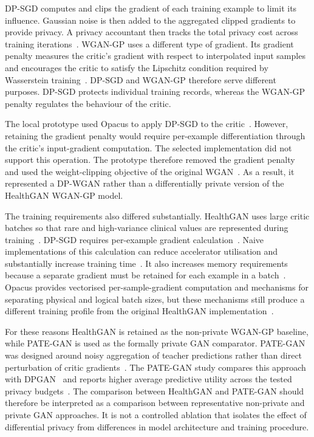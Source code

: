 DP-SGD computes and clips the gradient of each training example to limit
its influence. Gaussian noise is then added to the aggregated clipped
gradients to provide privacy. A privacy accountant then
tracks the total privacy cost across training
iterations~\cite{Abadi2016DPSGD}. WGAN-GP uses a different type of gradient.
Its gradient penalty measures the critic's gradient with respect to
interpolated input samples and encourages the critic to satisfy the Lipschitz
condition required by Wasserstein
training~\cite{Arjovsky2017WGAN,Gulrajani2017WGANGP}. DP-SGD and WGAN-GP
therefore serve different purposes. DP-SGD protects individual training
records, whereas the WGAN-GP penalty regulates the behaviour of the critic.

The local prototype used Opacus to apply DP-SGD to the
critic~\cite{Yousefpour2021Opacus}. However, retaining the gradient 
penalty would require per-example
differentiation through the critic's input-gradient computation. The
selected implementation did not support this operation. 
The prototype therefore removed the gradient penalty and used
the weight-clipping objective of the original
WGAN~\cite{Arjovsky2017WGAN}. As a result, it represented a DP-WGAN rather
than a differentially private version of the HealthGAN WGAN-GP model.

The training requirements also differed substantially. HealthGAN uses large
critic batches so that rare and high-variance clinical values are represented
during training~\cite{healthgan}. DP-SGD requires per-example gradient
calculation~\cite{Abadi2016DPSGD}. Naive implementations of this calculation
can reduce accelerator utilisation and substantially increase training
time~\cite{lee2021scaling}. It also increases memory requirements because a
separate gradient must be retained for each example in a
batch~\cite{Yousefpour2021Opacus}. Opacus provides vectorised
per-sample-gradient computation and mechanisms for separating physical and
logical batch sizes, but these mechanisms still produce a different training
profile from the original HealthGAN
implementation~\cite{Yousefpour2021Opacus}.

For these reasons HealthGAN is retained as the non-private WGAN-GP baseline,
while PATE-GAN is used as the formally private GAN comparator. PATE-GAN was
designed around noisy aggregation of teacher predictions rather than direct
perturbation of critic gradients~\cite{pategan,Papernot2017PATE}. The PATE-GAN
study compares this approach with DPGAN~\cite{Xie2018DPGAN} and reports higher
average predictive utility across the tested privacy
budgets~\cite{pategan}. The comparison between HealthGAN and PATE-GAN should
therefore be interpreted as a comparison between representative non-private
and private GAN approaches. It is not a controlled ablation that isolates the
effect of differential privacy from differences in model architecture and
training procedure.

